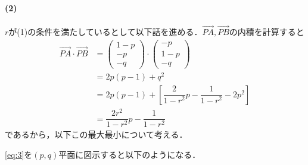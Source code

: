 \documentclass[../../main.tex]{subfiles}
\begin{document}
\paragraph{(2)}

$r$が(1)の条件を満たしているとして以下話を進める．$\overrightarrow{PA},\overrightarrow{PB}$の内積を計算すると
\begin{align}
  \overrightarrow{PA} \cdot \overrightarrow{PB} &=
  \begin{pmatrix} 1-p \\ -p \\ -q
  \end{pmatrix} \cdot
  \begin{pmatrix} -p \\ 1-p \\ -q
  \end{pmatrix} \\
  &= 2p(p-1) + q^2 \\
  &= 2p(p-1) + \left[ \dfrac{2}{1-r^2}p - \dfrac{1}{1-r^2} - 2p^2 \right] \\
  &= \dfrac{2r^2}{1-r^2}p - \dfrac{1}{1-r^2} \label{eq:5}
\end{align}
であるから，以下この最大最小について考える．

\cref{eq:3}を$(p,q)$平面に図示すると以下のようになる．
\end{document}

